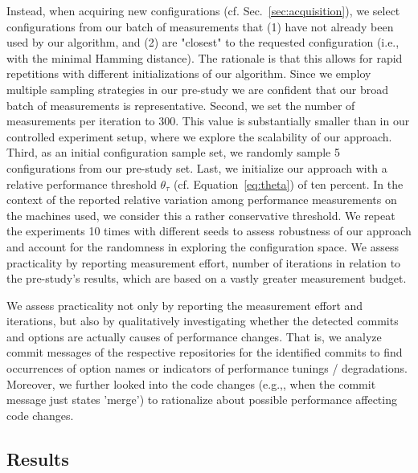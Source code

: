 \documentclass[sigconf]{acmart}
\begin{document}
	Instead, when acquiring new configurations (cf. Sec.~\ref{sec:acquisition}), we select configurations {\color{red} from our batch of measurements} that (1) have not already been used by our algorithm, and (2) are "closest" to the requested configuration (i.e., with the minimal Hamming distance). The rationale is that this allows for rapid repetitions with different initializations {\color{red}of our algorithm}. Since we employ multiple sampling strategies in our pre-study we are confident that our broad batch of measurements is representative. Second, we set the number of measurements per iteration to 300. This value is substantially smaller than in our controlled experiment setup, where we explore the scalability of our approach. Third, as an initial configuration sample set, we randomly sample 5 configurations from our pre-study set. 
	Last, we initialize our approach with a relative performance threshold $\theta_\tau$ (cf. Equation~\ref{eq:theta}) of ten percent. In the context of the reported relative variation among performance measurements on the machines used, we consider this a rather conservative threshold. 
	We repeat the experiments 10 times with different seeds to assess robustness of our approach and account for the randomness in exploring the configuration space.
	We assess practicality by reporting measurement effort, number of iterations in relation to the pre-study's results, which are based on a vastly greater measurement budget.
	
	We assess practicality not only by reporting the measurement effort and iterations, but also by qualitatively investigating whether the detected commits and options are actually causes of performance changes. That is, we analyze commit messages of the respective repositories for the identified commits to find occurrences of option names or indicators of performance tunings / degradations. Moreover, we further looked into the code changes (e.g.,, when the commit message just states 'merge') to rationalize about possible performance affecting code changes.
	
	\subsection{Results}	
\end{document}
